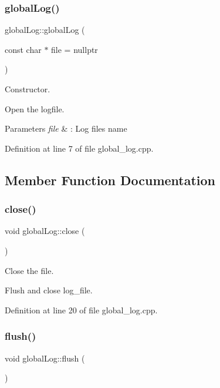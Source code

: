\subsubsection{\texorpdfstring{global\+Log()}{globalLog()}}
{\footnotesize\ttfamily global\+Log\+::global\+Log (\begin{DoxyParamCaption}\item[{const char $\ast$}]{file = {\ttfamily nullptr} }\end{DoxyParamCaption})}



Constructor. 

Open the logfile.


\begin{DoxyParams}{Parameters}
{\em file} & \+: Log file\textquotesingle{}s name \\
\hline
\end{DoxyParams}


Definition at line 7 of file global\+\_\+log.\+cpp.



\subsection{Member Function Documentation}
\hypertarget{classglobal_log_a9ce3b2370f87b2645c4c50354c4d63fa}{}\label{classglobal_log_a9ce3b2370f87b2645c4c50354c4d63fa} 
\subsubsection{\texorpdfstring{close()}{close()}}
{\footnotesize\ttfamily void global\+Log\+::close (\begin{DoxyParamCaption}{ }\end{DoxyParamCaption})}



Close the file. 

Flush and close log\+\_\+file. 

Definition at line 20 of file global\+\_\+log.\+cpp.

\hypertarget{classglobal_log_a45da7f9fb32a7d4319e3e2255769a24e}{}\label{classglobal_log_a45da7f9fb32a7d4319e3e2255769a24e} 
\subsubsection{\texorpdfstring{flush()}{flush()}}
{\footnotesize\ttfamily void global\+Log\+::flush (\begin{DoxyParamCaption}{ }\end{DoxyParamCaption})}



